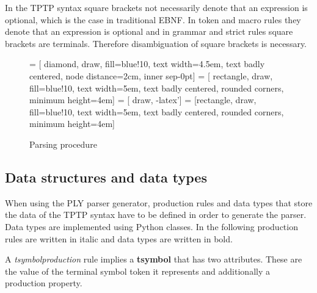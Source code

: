 In the \ac{TPTP} syntax square brackets not necessarily denote that an expression is optional, which is the case in traditional \ac{EBNF}.
In token and macro rules they denote that an expression is optional and in grammar and strict rules square brackets are terminals.
Therefore disambiguation of square brackets is necessary.
\begin{figure}[H]
 = [ diamond, draw, fill=blue!10, text width=4.5em, text badly centered, node distance=2cm, inner sep-0pt]  
 = [ rectangle, draw, fill=blue!10, text width=5em, text badly centered, rounded corners, minimum height=4em]  
 = [ draw, -latex']  
 = [rectangle, draw, fill=blue!10, text width=5em, text badly centered, rounded corners, minimum height=4em]  
\begin{center}
\end{center}
\caption{Parsing procedure}
\label{fig:ConceptParserFlow}
\end{figure}

\subsection{Data structures and data types}\label{sec:ConceptParserDataStructure}

When using the \ac{PLY} parser generator, production rules and data types that store the data of the \ac{TPTP} syntax have to be defined in order to generate the parser. Data types are implemented using Python classes. In the following production rules are written in italic and data types are written in bold.

A \textit{t\textunderscore symbol\textunderscore  production} rule implies a \textbf{t\textunderscore symbol} that has two attributes. These are the value of the terminal symbol token it represents and additionally a production property.

